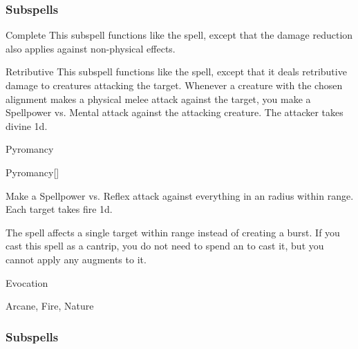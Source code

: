 \subsubsection{Subspells}


\begin{ability}[\nth{3}]{Complete}
This subspell functions like the  spell, except that the damage reduction also applies against non-physical effects.
\end{ability}
\vspace{0.25em}


\begin{ability}[\nth{4}]{Retributive}
This subspell functions like the  spell, except that it deals retributive damage to creatures attacking the target.
Whenever a creature with the chosen alignment makes a physical melee attack against the target, you make a Spellpower vs. Mental attack against the attacking creature.
\hit The attacker takes divine  \minus1d.
\end{ability}
\vspace{0.25em}

\newpage
\begin{spellsection}{Pyromancy}

\begin{spellheader}
\end{spellheader}


\begin{ability}{Pyromancy}[]

Make a Spellpower vs. Reflex attack against everything in an \areasmall radius within \rngclose range.
\hit Each target takes fire  \minus1d.

\end{ability}



 The spell affects a single target within range instead of creating a burst. If you cast this spell as a cantrip,
you do not need to spend an  to cast it,
but you cannot apply any augments to it.


 Evocation

 Arcane, Fire, Nature
\end{spellsection}


\subsubsection{Subspells}


